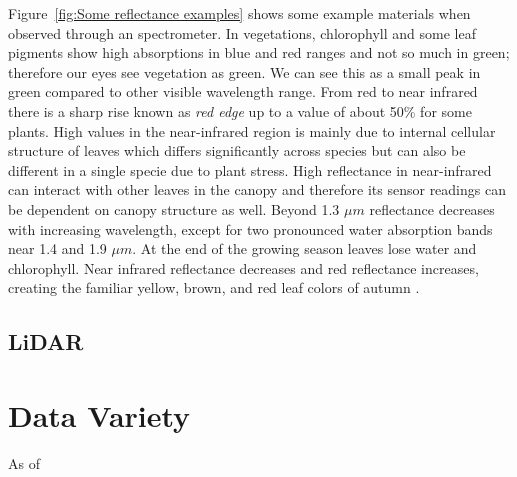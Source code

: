 Figure~\ref{fig:Some reflectance examples} shows some example materials when observed through an spectrometer. In vegetations, chlorophyll and some leaf pigments show high absorptions in blue and red ranges and not so much in green; therefore our eyes see vegetation as green. We can see this as a small peak in green compared to other visible wavelength range. From red to near infrared there is a sharp rise known as \textit{red edge} up to a value of about 50\% for some plants. High values in the near-infrared region is mainly due to internal cellular structure of leaves which differs significantly across species but can also be different in a single specie due to plant stress. High reflectance in near-infrared can interact with other leaves in the canopy and therefore its sensor readings can be dependent on canopy structure as well. Beyond 1.3 $μm$ reflectance decreases with increasing wavelength, except for two pronounced water absorption bands near 1.4 and 1.9 $μm$. At the end of the growing season leaves lose water and chlorophyll. Near infrared reflectance decreases and red reflectance increases, creating the familiar yellow, brown, and red leaf colors of autumn \citep{smith2006introduction}.

\subsection{LiDAR}



\section{Data Variety}

As of 


%
%






